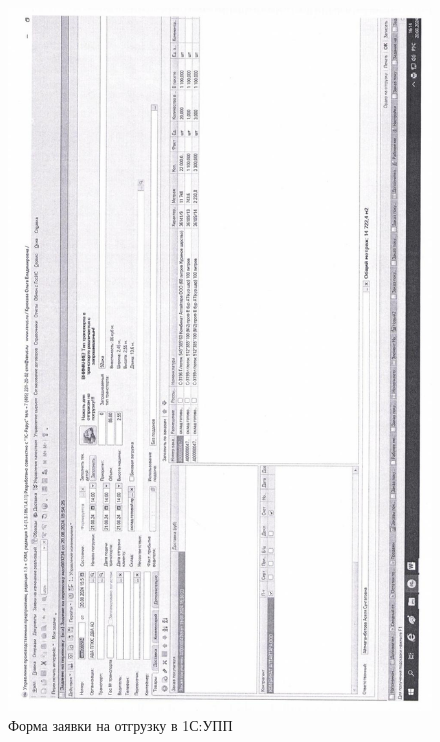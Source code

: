 \begin{figure}
\begin{center}
 \includegraphics[width=\linewidth, height=0.94\textheight, keepaspectratio]{Pics/d15.jpg}
\end{center}
 \caption{Форма заявки на отгрузку в 1С:УПП}
 \label{pic:d15}
\end{figure}

